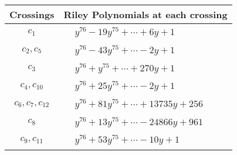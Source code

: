 \documentclass[1p]{elsarticle_modified}
\theoremstyle{definition}
\begin{document}
\begin{tabular}{m{50pt}|m{274pt}}
Crossings & \hspace{64pt}Riley Polynomials at each crossing \\
\hline $$\begin{aligned}c_{1}\end{aligned}$$&$\begin{aligned}
&y^{76}-19 y^{75}+\cdots+6 y+1
\end{aligned}$\\
\hline $$\begin{aligned}c_{2},c_{5}\end{aligned}$$&$\begin{aligned}
&y^{76}-43 y^{75}+\cdots-2 y+1
\end{aligned}$\\
\hline $$\begin{aligned}c_{3}\end{aligned}$$&$\begin{aligned}
&y^{76}+y^{75}+\cdots+270 y+1
\end{aligned}$\\
\hline $$\begin{aligned}c_{4},c_{10}\end{aligned}$$&$\begin{aligned}
&y^{76}+25 y^{75}+\cdots-2 y+1
\end{aligned}$\\
\hline $$\begin{aligned}c_{6},c_{7},c_{12}\end{aligned}$$&$\begin{aligned}
&y^{76}+81 y^{75}+\cdots+13735 y+256
\end{aligned}$\\
\hline $$\begin{aligned}c_{8}\end{aligned}$$&$\begin{aligned}
&y^{76}+13 y^{75}+\cdots-24866 y+961
\end{aligned}$\\
\hline $$\begin{aligned}c_{9},c_{11}\end{aligned}$$&$\begin{aligned}
&y^{76}+53 y^{75}+\cdots-10 y+1
\end{aligned}$\\
\hline
\end{tabular}
\vskip 2pc
\end{document}
